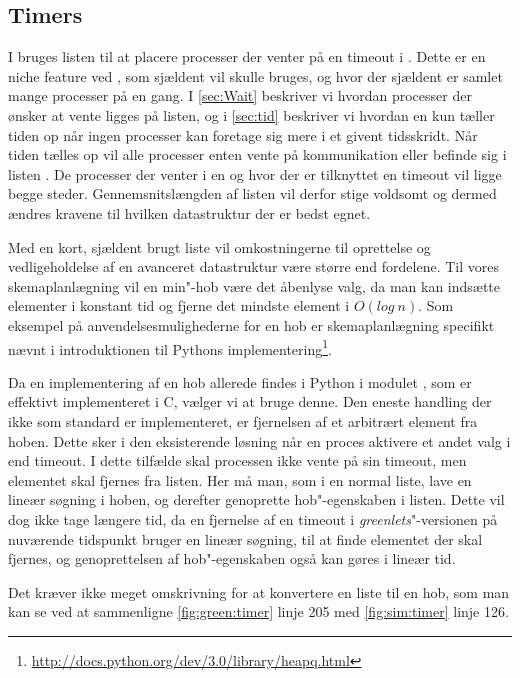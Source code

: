 \subsection{Timers}  
I \pycsp bruges listen  til at placere processer der venter på en timeout i . Dette er en niche feature ved \pycsp, som  sjældent vil skulle bruges, og hvor der sjældent er samlet mange processer på en gang. 
 I \cref{sec:Wait} beskriver vi hvordan processer der ønsker at vente ligges på  listen, og i \cref{sec:tid} beskriver vi hvordan \sched en kun tæller tiden op når ingen processer kan foretage sig mere i et givent tidsskridt. Når tiden tælles op vil  alle processer enten vente på kommunikation eller befinde sig i listen . De processer der venter i en  og hvor der er tilknyttet en timeout vil ligge begge steder. Gennemsnitslængden af listen vil derfor stige voldsomt og dermed ændres kravene til hvilken  datastruktur der er bedst egnet. 
 
Med en kort, sjældent brugt liste vil omkostningerne til oprettelse og vedligeholdelse af en avanceret datastruktur være større end fordelene. Til vores skemaplanlægning  vil en min"-hob være det åbenlyse valg, da  man kan  indsætte elementer i konstant tid og fjerne det mindste element i $O(log\ n)$. Som eksempel på anvendelsesmulighederne for en hob er skemaplanlægning specifikt nævnt i introduktionen til Pythons implementering\footnote{\url{http://docs.python.org/dev/3.0/library/heapq.html}}.  

Da en implementering af en hob allerede findes i Python i modulet , som er effektivt implementeret i C, vælger vi at bruge denne. Den eneste handling
der ikke som standard er implementeret, er fjernelsen af et arbitrært element fra hoben. Dette sker i den eksisterende løsning når en proces
aktivere et andet valg i  end timeout. I dette tilfælde skal
processen ikke vente på sin timeout, men elementet skal fjernes fra
 listen. Her må man, som i
en normal liste, lave en lineær søgning i hoben, og derefter genoprette
hob"-egenskaben i listen. Dette vil dog ikke tage længere tid, da en fjernelse af en timeout i \emph{greenlets}"-versionen på nuværende
tidspunkt bruger en lineær søgning, til at finde elementet der skal
fjernes, og genoprettelsen af hob"-egenskaben også kan gøres i lineær tid.

Det kræver ikke meget omskrivning for at konvertere en liste til en hob, som man kan se ved at sammenligne \cref{fig:green:timer} linje 205 med \cref{fig:sim:timer} linje 126. 

